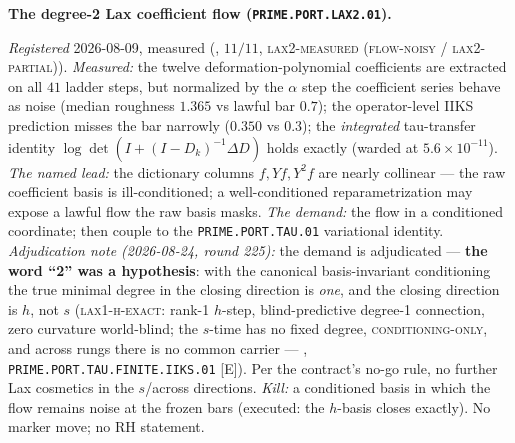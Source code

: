 \par\smallskip\noindent\textbf{The degree-2 Lax coefficient flow
(\texttt{PRIME.PORT.\allowbreak LAX2.01}).}
{\sloppy
\emph{Registered} 2026-08-09, measured
(, $11/11$,
\textsc{lax2-measured (flow-noisy / lax2-partial)}).
\emph{Measured:} the twelve deformation-polynomial coefficients
are extracted on all $41$ ladder steps, but normalized by the
$\alpha$ step the coefficient series behave as noise (median
roughness $1.365$ vs lawful bar $0.7$); the operator-level IIKS
prediction misses the bar narrowly ($0.350$ vs $0.3$); the
\emph{integrated} tau-transfer identity $\log\det(I + (I -
D_k)^{-1}\Delta D)$ holds exactly (warded at
$5.6\times10^{-11}$).  \emph{The named lead:} the dictionary
columns $f, Yf, Y^2 f$ are nearly collinear --- the raw
coefficient basis is ill-conditioned; a well-conditioned
reparametrization may expose a lawful flow the raw basis masks.
\emph{The demand:} the flow in a conditioned coordinate; then
couple to the \texttt{PRIME.PORT.TAU.01} variational identity.
\emph{Adjudication note (2026-08-24, round 225):} the demand is
adjudicated --- \textbf{the word ``2'' was a hypothesis}: with
the canonical basis-invariant conditioning the true minimal
degree in the closing direction is \emph{one}, and the closing
direction is $h$, not $s$ (\textsc{lax1-h-exact}: rank-1
$h$-step, blind-predictive degree-1 connection, zero curvature
world-blind; the $s$-time has no fixed degree,
\textsc{conditioning-only}, and across rungs there is no common
carrier --- ,
\texttt{PRIME.PORT.TAU.FINITE.IIKS.01} [E]).  Per the contract's
no-go rule, no further Lax cosmetics in the $s$/across
directions.  \emph{Kill:} a conditioned basis in which the flow
remains noise at the frozen bars (executed: the $h$-basis
closes exactly).  No marker move; no RH statement.\par}


